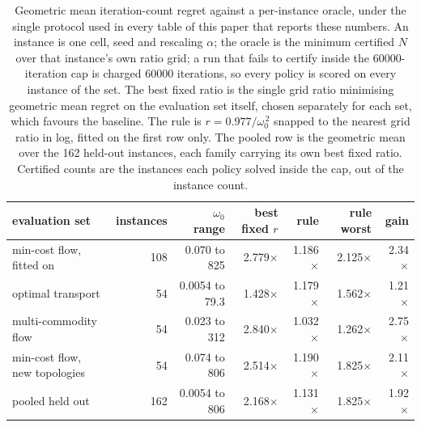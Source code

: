\begin{table}[t]
\centering
\caption{Geometric mean iteration-count regret against a per-instance oracle,
under the single protocol used in every table of this paper that reports these
numbers. An instance is one cell, seed and rescaling $\alpha$; the oracle is
the minimum certified $N$ over that instance's own ratio grid; a run that fails
to certify inside the 60000-iteration cap is charged 60000 iterations, so every
policy is scored on every instance of the set. The best fixed ratio is the
single grid ratio minimising geometric mean regret on the evaluation set
itself, chosen separately for each set, which favours the baseline. The rule is
$r = 0.977/\omega_0^{\,2}$ snapped to the nearest grid ratio in log, fitted on
the first row only. The pooled row is the geometric mean over the 162 held-out
instances, each family carrying its own best fixed ratio. Certified counts are
the instances each policy solved inside the cap, out of the instance count.}
\label{tab:intro-omega}
\begin{tabular}{lrrrrrr}
\toprule
evaluation set & instances & $\omega_0$ range & best fixed $r$ & rule & rule worst & gain \\
\midrule
min-cost flow, fitted on      & 108 & 0.070 to 825   & 2.779$\times$ & 1.186$\times$ & 2.125$\times$ & 2.34$\times$ \\
optimal transport             &  54 & 0.0054 to 79.3 & 1.428$\times$ & 1.179$\times$ & 1.562$\times$ & 1.21$\times$ \\
multi-commodity flow          &  54 & 0.023 to 312   & 2.840$\times$ & 1.032$\times$ & 1.262$\times$ & 2.75$\times$ \\
min-cost flow, new topologies &  54 & 0.074 to 806   & 2.514$\times$ & 1.190$\times$ & 1.825$\times$ & 2.11$\times$ \\
\midrule
pooled held out               & 162 & 0.0054 to 806  & 2.168$\times$ & 1.131$\times$ & 1.825$\times$ & 1.92$\times$ \\
\bottomrule
\end{tabular}
\end{table}


